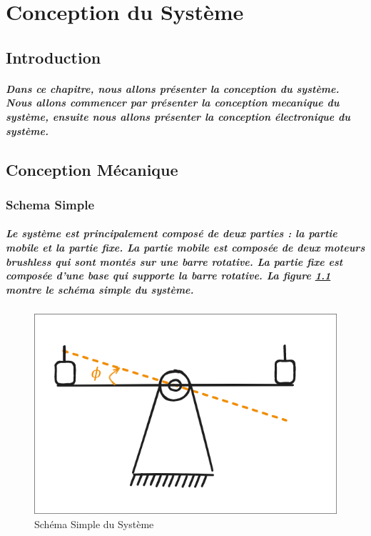\chapter{Conception du Système}
\label{cp:systemdesign}

\section{Introduction}

\paragraph{Dans ce chapitre, nous allons présenter la conception du système. Nous allons commencer par présenter la conception mecanique du système, ensuite nous allons présenter la conception électronique du système.
}
\section{Conception Mécanique}

\subsection{Schema Simple}

\paragraph{
	Le système est principalement composé de deux parties : la partie mobile et la partie fixe. La partie mobile est composée de deux moteurs brushless qui sont montés sur une barre rotative. La partie fixe est composée d'une base qui supporte la barre rotative. La figure \ref{fig:system} montre le schéma simple du système.
}

\begin{figure}[!htpb]
	\centering
	\includegraphics[width=0.6\linewidth]{Figures/schema-simple.png}
	\caption{Schéma Simple du Système}
	\label{fig:system}
\end{figure}

